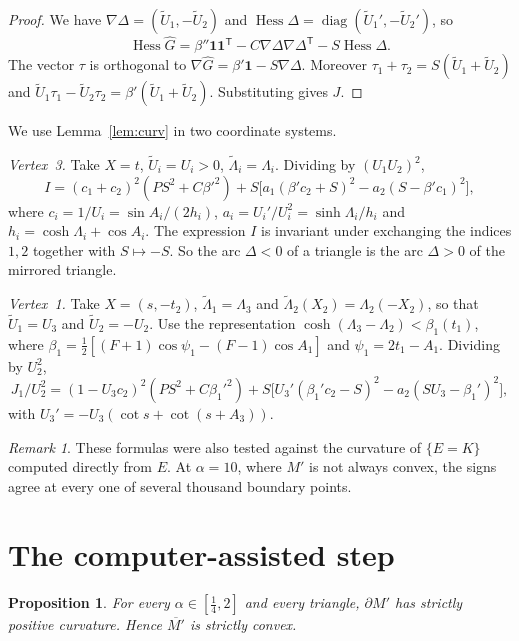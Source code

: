\documentclass[11pt]{amsart}
\newtheorem{proposition}[theorem]{Proposition}
\theoremstyle{remark}
\newtheorem{remark}[theorem]{Remark}
\DeclareMathOperator{\Hess}{Hess}
\begin{document}
\begin{proof}
We have $\nabla\Delta=(\tilde U_1,-\tilde U_2)$ and $\Hess\Delta=\operatorname{diag}(\tilde U_1',-\tilde U_2')$, so
\[
  \Hess\hat G=\beta''\mathbf 1\mathbf 1^{\mathsf T}-C\nabla\Delta\nabla\Delta^{\mathsf T}-S\Hess\Delta .
\]
The vector $\tau$ is orthogonal to $\nabla\hat G=\beta'\mathbf 1-S\nabla\Delta$. Moreover
$\tau_1+\tau_2=S(\tilde U_1+\tilde U_2)$ and $\tilde U_1\tau_1-\tilde U_2\tau_2=\beta'(\tilde U_1+\tilde U_2)$.
Substituting gives $J$.
\end{proof}

We use Lemma~\ref{lem:curv} in two coordinate systems.

\emph{Vertex~3.} Take $X=t$, $\tilde U_i=U_i>0$, $\tilde\Lambda_i=\Lambda_i$. Dividing by $(U_1U_2)^2$,
\begin{equation}\label{eq:I}
  I=(c_1+c_2)^2(PS^2+C\beta'^2)+S\bigl[a_1(\beta'c_2+S)^2-a_2(S-\beta'c_1)^2\bigr],
\end{equation}
where $c_i=1/U_i=\sin A_i/(2h_i)$, $a_i=U_i'/U_i^2=\sinh\Lambda_i/h_i$ and $h_i=\cosh\Lambda_i+\cos A_i$. The expression
$I$ is invariant under exchanging the indices $1,2$ together with $S\mapsto-S$. So the arc $\Delta<0$ of a triangle is
the arc $\Delta>0$ of the mirrored triangle.

\emph{Vertex~1.} Take $X=(s,-t_2)$, $\tilde\Lambda_1=\Lambda_3$ and $\tilde\Lambda_2(X_2)=\Lambda_2(-X_2)$, so that
$\tilde U_1=U_3$ and $\tilde U_2=-U_2$. Use the representation $\cosh(\Lambda_3-\Lambda_2)<\beta_1(t_1)$, where
$\beta_1=\tfrac12[(F+1)\cos\psi_1-(F-1)\cos A_1]$ and $\psi_1=2t_1-A_1$. Dividing by $U_2^2$,
\begin{equation}\label{eq:J1}
  J_1/U_2^2=(1-U_3c_2)^2(PS^2+C\beta_1'^2)+S\bigl[U_3'(\beta_1'c_2-S)^2-a_2(SU_3-\beta_1')^2\bigr],
\end{equation}
with $U_3'=-U_3(\cot s+\cot(s+A_3))$.

\begin{remark}
These formulas were also tested against the curvature of $\{E=K\}$ computed directly from $E$. At $\alpha=10$, where
$M'$ is not always convex, the signs agree at every one of several thousand boundary points.
\end{remark}

\section{The computer-assisted step}\label{sec:cert}

\begin{proposition}\label{prop:M}
For every $\alpha\in[\tfrac14,2]$ and every triangle, $\partial M'$ has strictly positive curvature. Hence
$\overline{M'}$ is strictly convex.
\end{proposition}
\end{document}
